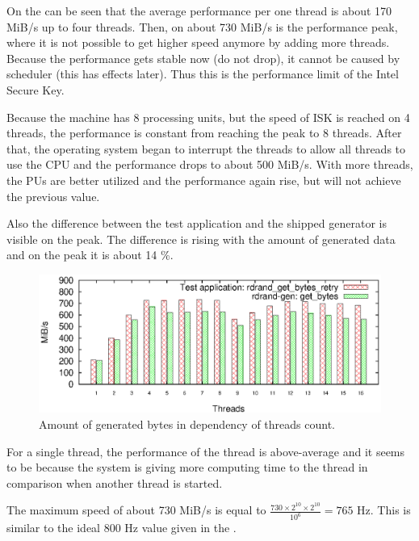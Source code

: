 On the  can be seen that the average performance per one thread is about 170 MiB/s up to four threads. Then, on about 730 MiB/s is the performance peak, where it is not possible to get higher speed anymore by adding more threads. Because the performance gets stable now (do not drop), it cannot be caused by scheduler (this has effects later). Thus this is the performance limit of the Intel Secure Key. 

Because the machine has 8 processing units, but the speed of ISK is reached on 4 threads, the performance is constant from reaching the peak to 8 threads. After that, the operating system began to interrupt the threads to allow all threads to use the CPU and the performance drops to about 500 MiB/s. With more threads, the PUs are better utilized and the performance again rise, but will not achieve the previous value.

Also the difference between the test application and the shipped generator is visible on the peak. The difference is rising with the amount of generated data and on the peak it is about 14 \%.


\begin{figure}[h!]
  \centering
 \includegraphics[width=15cm]{fig/tests/scaling.eps} %
\caption{Amount of generated bytes in dependency of threads count.}
\label{fig:testing:threadsScalability}
\end{figure}

For a single thread, the performance of the thread is above-average and it seems to be because the system is giving more computing time to the thread in comparison when another thread is started.

The maximum speed of about 730 MiB/s is equal to $\frac{730 \times 2^{10} \times 2^{10}}{10^6}=765$ Hz. This is similar to the ideal 800 Hz value given in the .


